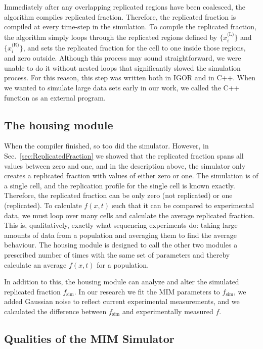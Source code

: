 		Immediately after any overlapping replicated regions have been coalesced, the algorithm compiles replicated fraction.
		Therefore, the replicated fraction is compiled at every time-step in the simulation.
		To compile the replicated fraction, the algorithm simply loops through the replicated regions defined by $\{x_i^\text{(L)}\}$ and $\{x_i^\text{(R)}\}$, and sets the replicated fraction for the cell to one inside those regions, and zero outside.
		Although this process may sound straightforward, we were unable to do it without nested loops that significantly slowed the simulation process.
		For this reason, this step was written both in IGOR and in C++.
		When we wanted to simulate large data sets early in our work, we called the C++ function as an external program.
		
		
		\subsection{The housing module}
		\label{subsec:Housing}
		
		When the compiler finished, so too did the simulator.
		However, in Sec.~\ref{sec:ReplicatedFraction} we showed that the replicated fraction spans all values between zero and one, and in the description above, the simulator only creates a replicated fraction with values of either zero or one.
		The simulation is of a single cell, and the replication profile for the single cell is known exactly.
		Therefore, the replicated fraction can be only zero (not replicated) or one (replicated).
		To calculate $f(x,t)$ such that it can be compared to experimental data, we must loop over many cells and calculate the average replicated fraction.
		This is, qualitatively, exactly what sequencing experiments do: taking large amounts of data from a population and averaging them to find the average behaviour.
		The housing module is designed to call the other two modules a prescribed number of times with the same set of parameters and thereby calculate an average $f(x,t)$ for a population.
		
		In addition to this, the housing module can analyze and alter the simulated replicated fraction $f_\text{sim}$.
		In our research we fit the MIM parameters to $f_\text{sim}$, we added Gaussian noise to reflect current experimental measurements, and we calculated the difference between $f_\text{sim}$ and experimentally measured $f$.
		
		
		\subsection{Qualities of the MIM Simulator}
		\label{subsec:QualitiesofMIMSimulator}
		
